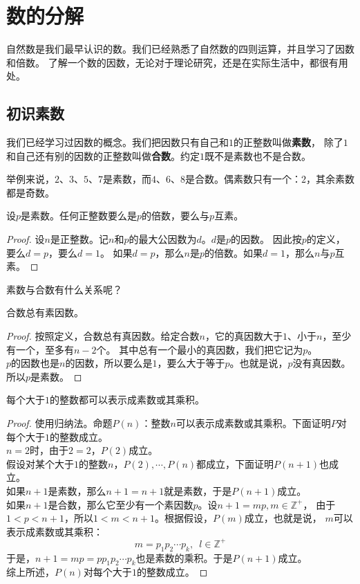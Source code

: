 \documentclass[12pt,UTF8,fontset=none]{ctexbook}
\begin{document}
\chapter{数的分解}
自然数是我们最早认识的数。我们已经熟悉了自然数的四则运算，并且学习了因数和倍数。
了解一个数的因数，无论对于理论研究，还是在实际生活中，都很有用处。
\section{初识素数}
我们已经学习过因数的概念。我们把因数只有自己和$1$的正整数叫做\textbf{素数}，
除了$1$和自己还有别的因数的正整数叫做\textbf{合数}。约定$1$既不是素数也不是合数。

举例来说，$2$、$3$、$5$、$7$是素数，而$4$、$6$、$8$是合数。偶素数只有一个：$2$，其余素数都是奇数。

\begin{tm}\label{tm:1-0-0}
    设$p$是素数。任何正整数要么是$p$的倍数，要么与$p$互素。
\end{tm}
\begin{proof}
    设$n$是正整数。记$n$和$p$的最大公因数为$d$。$d$是$p$的因数。
    因此按$p$的定义，要么$d = p$，要么$d = 1$。
    如果$d = p$，那么$n$是$p$的倍数。如果$d = 1$，那么$n$与$p$互素。
\end{proof}

素数与合数有什么关系呢？

\begin{tm}\label{tm:1-0-4}
    合数总有素因数。
\end{tm}
\begin{proof}
    按照定义，合数总有真因数。给定合数$n$，它的真因数大于$1$、小于$n$，至少有一个，至多有$n-2$个。
    其中总有一个最小的真因数，我们把它记为$p$。\\
    $p$的因数也是$n$的因数，所以要么是$1$，要么大于等于$p$。也就是说，$p$没有真因数。所以$p$是素数。
\end{proof}

\begin{tm}\label{tm:1-0-6}
    每个大于$1$的整数都可以表示成素数或其乘积。
\end{tm}
\begin{proof}
    使用归纳法。命题$P(n)$：整数$n$可以表示成素数或其乘积。下面证明$P$对每个大于$1$的整数成立。\\
    $n=2$时，由于$2 = 2$，$P(2)$成立。\\
    假设对某个大于$1$的整数$n$，$P(2), \cdots, P(n)$都成立，下面证明$P(n+1)$也成立。\\
    如果$n+1$是素数，那么$n+1 = n+1$就是素数，于是$P(n+1)$成立。\\
    如果$n+1$是合数，那么它至少有一个素因数$p$。设$n+1 = mp, m\in\mathbb{Z}^+$，
    由于$1<p<n+1$，所以$1< m < n+1$。根据假设，$P(m)$成立，也就是说，
    $m$可以表示成素数或其乘积：
    $$ m = p_1 p_2\cdots p_k, \,\,\, l\in\mathbb{Z}^+$$
    于是，$n+1 = mp = pp_1 p_2\cdots p_k$也是素数的乘积。于是$P(n+1)$成立。\\
    综上所述，$P(n)$对每个大于$1$的整数成立。
\end{proof}
\end{document}
